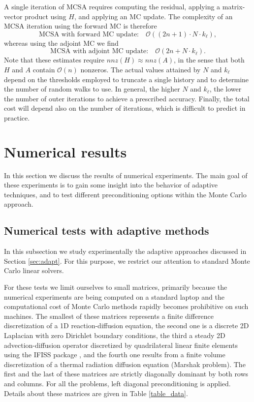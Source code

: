 \documentclass[times]{nlaauth}
\begin{document}
A single iteration of MCSA requires computing the residual, applying a matrix-vector product using $H$, and applying an MC update.
The complexity of an MCSA iteration using the forward MC is therefore
\begin{equation}
\text{MCSA with forward MC update:}\quad \mathcal{O}((2n + 1) \cdot N\cdot k_{\ell}),
\label{mcsafor_cost}
\end{equation}
whereas using the adjoint MC we find
\begin{equation}
\text{MCSA with adjoint MC update:}\quad \mathcal{O}(2n + N\cdot k_{\ell}).
\label{mcsaadj_cost}
\end{equation}
Note that these estimates require $nnz(H)\approx nnz(A)$, in the sense that both $H$ and $A$ contain $\mathcal{O}(n)$ nonzeros.
The actual values attained by $N$ and $k_{\ell}$ depend on the thresholds employed to truncate a single history and to determine
the number of random walks to use. In general, the higher $N$ and $k_{\ell}$, the lower the number of outer iterations to achieve
a prescribed accuracy.
Finally, the total cost will depend also on the number of iterations, which is difficult to predict in practice.


\section{Numerical results}
\label{sec:results}

In this section we discuss the results of numerical experiments. The main goal
of these experiments is to gain some insight into the behavior of adaptive
techniques, and to test different preconditioning options within the
Monte Carlo approach.

\subsection{Numerical tests with adaptive methods}

In this subsection we study experimentally the
adaptive approaches discussed in Section \ref{sec:adapt}.
For this purpose, we restrict our attention to standard Monte Carlo linear
solvers.

For these tests we limit ourselves
to small matrices, primarily because the numerical experiments are
being computed on a standard laptop and the computational cost of
Monte Carlo methods rapidly becomes prohibitive on such machines.
The smallest of these matrices represents a finite
difference discretization of a 1D reaction-diffusion equation,
the second one is a discrete 2D Laplacian with zero Dirichlet boundary
conditions, the third a steady 2D advection-diffusion operator discretized
by quadrilateral linear finite elements using the IFISS package \cite{ifiss},
and the fourth one
results from a finite volume discretization of
a thermal radiation diffusion equation (Marshak problem). The first and the last of these
matrices are strictly diagonally dominant by both rows and columns.
For all the problems, left diagonal preconditioning is applied.
Details about these matrices are given in Table
\ref{table_data}.
\end{document}
